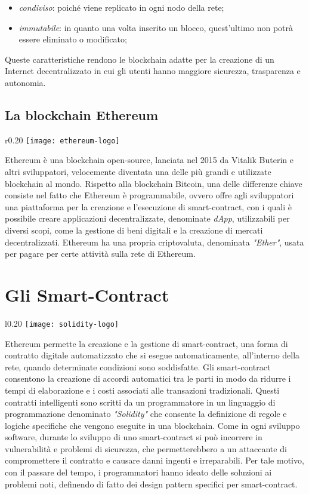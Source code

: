 \begin{itemize}
	\item \textit{condiviso}: poiché viene replicato in ogni nodo della rete;
	\item \textit{immutabile}: in quanto una volta inserito un blocco, quest'ultimo non potrà essere eliminato o modificato;
\end{itemize}
Queste caratteristiche rendono le blockchain adatte per la creazione di un Internet decentralizzato in cui gli utenti hanno maggiore sicurezza, trasparenza e autonomia.

\subsection{La blockchain Ethereum}

\begin{wrapfigure}{r}{0.20\textwidth}
	\centering
	\texttt{[image: ethereum-logo]}
\end{wrapfigure}

Ethereum\cite{ethereum} è una blockchain open-source, lanciata nel 2015 da Vitalik Buterin e altri sviluppatori, velocemente diventata una delle più grandi e utilizzate blockchain al mondo. Rispetto alla blockchain Bitcoin, una delle differenze chiave consiste nel fatto che Ethereum è programmabile, ovvero offre agli sviluppatori una piattaforma per la creazione e l'esecuzione di smart-contract, con i quali è possibile creare applicazioni decentralizzate, denominate \textit{dApp}, utilizzabili per diversi scopi, come la gestione di beni digitali e la creazione di mercati decentralizzati. Ethereum ha una propria criptovaluta, denominata \textit{"Ether"}, usata per pagare per certe attività sulla rete di Ethereum.

\section{Gli Smart-Contract}

\begin{wrapfigure}{l}{0.20\textwidth}
	\centering
	\texttt{[image: solidity-logo]}
\end{wrapfigure}

Ethereum permette la creazione e la gestione di smart-contract, una forma di contratto digitale automatizzato che si esegue automaticamente, all'interno della rete, quando determinate condizioni sono soddisfatte. Gli smart-contract consentono la creazione di accordi automatici tra le parti in modo da ridurre i tempi di elaborazione e i costi associati alle transazioni tradizionali. Questi contratti intelligenti sono scritti da un programmatore in un linguaggio di programmazione denominato \textit{"Solidity"}\cite{solidity} che consente la definizione di regole e logiche specifiche che vengono eseguite in una blockchain. Come in ogni sviluppo software, durante lo sviluppo di uno smart-contract si può incorrere in vulnerabilità e problemi di sicurezza, che permetterebbero a un attaccante di compromettere il contratto e causare danni ingenti e irreparabili. Per tale motivo, con il passare del tempo, i programmatori hanno ideato delle soluzioni ai problemi noti, definendo di fatto dei design pattern specifici per smart-contract.

